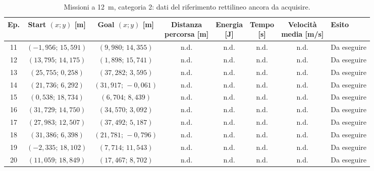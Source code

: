\begin{table}[H]
\centering
\caption{Missioni a 12~m, categoria 2: dati del riferimento rettilineo ancora da acquisire.}
\label{tab:big-map-12m-baseline-cat2}
\begingroup
\fontsize{9}{11}\selectfont
\setlength{\tabcolsep}{2.5pt}
\renewcommand{\arraystretch}{1.2}
\begin{tabular}{@{}c cc cccc l@{}}
\toprule
Ep. & \shortstack{Start $(x;y)$\\{}[m]} & \shortstack{Goal $(x;y)$\\{}[m]} & \shortstack{Distanza\\percorsa [m]} & \shortstack{Energia\\{}[J]} & \shortstack{Tempo\\{}[s]} & \shortstack{Velocità\\media [m/s]} & Esito \\
\midrule
11 & $(-1{,}956;\,15{,}591)$ & $(9{,}980;\,14{,}355)$ & n.d. & n.d. & n.d. & n.d. & Da eseguire \\
12 & $(13{,}795;\,14{,}175)$ & $(1{,}898;\,15{,}741)$ & n.d. & n.d. & n.d. & n.d. & Da eseguire \\
13 & $(25{,}755;\,0{,}258)$ & $(37{,}282;\,3{,}595)$ & n.d. & n.d. & n.d. & n.d. & Da eseguire \\
14 & $(21{,}736;\,6{,}292)$ & $(31{,}917;\,-0{,}061)$ & n.d. & n.d. & n.d. & n.d. & Da eseguire \\
15 & $(0{,}538;\,18{,}734)$ & $(6{,}704;\,8{,}439)$ & n.d. & n.d. & n.d. & n.d. & Da eseguire \\
16 & $(31{,}729;\,14{,}750)$ & $(34{,}570;\,3{,}092)$ & n.d. & n.d. & n.d. & n.d. & Da eseguire \\
17 & $(27{,}983;\,12{,}507)$ & $(37{,}492;\,5{,}187)$ & n.d. & n.d. & n.d. & n.d. & Da eseguire \\
18 & $(31{,}386;\,6{,}398)$ & $(21{,}781;\,-0{,}796)$ & n.d. & n.d. & n.d. & n.d. & Da eseguire \\
19 & $(-2{,}335;\,18{,}102)$ & $(7{,}714;\,11{,}543)$ & n.d. & n.d. & n.d. & n.d. & Da eseguire \\
20 & $(11{,}059;\,18{,}849)$ & $(17{,}467;\,8{,}702)$ & n.d. & n.d. & n.d. & n.d. & Da eseguire \\
\bottomrule
\end{tabular}
\endgroup
\end{table}

